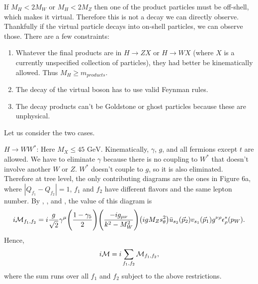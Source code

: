 If $M_H<2M_W$ or $M_H<2M_Z$ then one of the product particles must be
off-shell, which makes it virtual. Therefore this is not a decay we can
directly observe. Thankfully if the virtual particle decays into on-shell
particles, we can observe those. There are a few constraints:
\begin{enumerate}
  \item Whatever the final products are in $H\to ZX$ or $H\to WX$ (where $X$ is
        a currently unspecified collection of particles), they had better be
        kinematically allowed. Thus $M_H\geq m_{products}$.
  \item The decay of the virtual boson has to use valid Feynman rules.
  \item The decay products can't be Goldstone or ghost particles because these
        are unphysical.
\end{enumerate}
Let us consider the two cases.

\underline{$H\to WW^*$}: Here $M_X\leq\text{45~GeV}$. Kinematically, $\gamma$,
$g$, and all fermions except $t$ are allowed. We have to eliminate $\gamma$
because there is no coupling to $W^*$ that doesn't involve another $W$ or $Z$.
$W^*$ doesn't couple to $g$, so it is also eliminated. Therefore at tree level,
the only contributing diagrams are the ones in Figure 6a, where
$|Q_{f_1}-Q_{f_2}|=1$, $f_1$ and $f_2$ have different flavors and the same
lepton number. By , , and , the value of this diagram is
\begin{equation}
  i\mathcal{M}_{f_1,f_2}=i\frac{g}{\sqrt{2}}\gamma^\mu
    \Bigg(\frac{1-\gamma_5}{2}\Bigg)\Bigg(\frac{-ig_{\mu\nu}}{k^2-M_W^2}\Bigg)
       \big(igM_Zs_{\theta}^2\big)\bar{u}_{s_2}(\vec{p}_2)v_{s_1}(\vec{p}_1)
       g^{\nu\rho}\epsilon^*_\rho(p_W).
\end{equation}
Hence,
\begin{equation}
  i\mathcal{M}=i\sum\limits_{f_1,f_2}\mathcal{M}_{f_1,f_2},
\end{equation}
where the sum runs over all $f_1$ and $f_2$ subject to the above restrictions.

